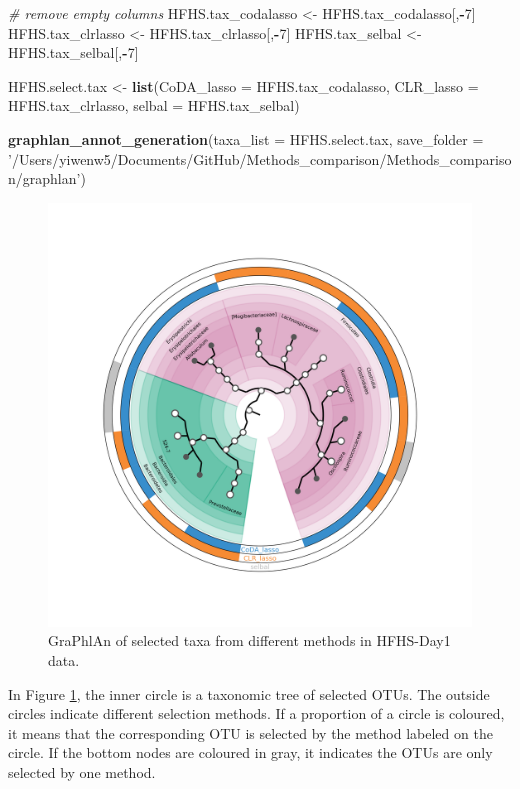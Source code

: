 \documentclass[openany]{book}
\newenvironment{Shaded}{\begin{snugshade}}{\end{snugshade}}
\newcommand{\KeywordTok}[1]{\textcolor[rgb]{0.13,0.29,0.53}{\textbf{#1}}}
\newcommand{\DataTypeTok}[1]{\textcolor[rgb]{0.13,0.29,0.53}{#1}}
\newcommand{\DecValTok}[1]{\textcolor[rgb]{0.00,0.00,0.81}{#1}}
\newcommand{\StringTok}[1]{\textcolor[rgb]{0.31,0.60,0.02}{#1}}
\newcommand{\CommentTok}[1]{\textcolor[rgb]{0.56,0.35,0.01}{\textit{#1}}}
\newcommand{\OperatorTok}[1]{\textcolor[rgb]{0.81,0.36,0.00}{\textbf{#1}}}
\newcommand{\NormalTok}[1]{#1}
\begin{document}
\begin{Shaded}
\begin{Highlighting}[]
\CommentTok{# remove empty columns}
\NormalTok{HFHS.tax_codalasso <-}\StringTok{ }\NormalTok{HFHS.tax_codalasso[,}\OperatorTok{-}\DecValTok{7}\NormalTok{] }
\NormalTok{HFHS.tax_clrlasso <-}\StringTok{ }\NormalTok{HFHS.tax_clrlasso[,}\OperatorTok{-}\DecValTok{7}\NormalTok{]}
\NormalTok{HFHS.tax_selbal <-}\StringTok{ }\NormalTok{HFHS.tax_selbal[,}\OperatorTok{-}\DecValTok{7}\NormalTok{]}

\NormalTok{HFHS.select.tax <-}\StringTok{ }\KeywordTok{list}\NormalTok{(}\DataTypeTok{CoDA_lasso =}\NormalTok{ HFHS.tax_codalasso, }
                        \DataTypeTok{CLR_lasso =}\NormalTok{ HFHS.tax_clrlasso, }
                        \DataTypeTok{selbal =}\NormalTok{ HFHS.tax_selbal)}

\KeywordTok{graphlan_annot_generation}\NormalTok{(}\DataTypeTok{taxa_list =}\NormalTok{ HFHS.select.tax, }
\DataTypeTok{save_folder =} \StringTok{'/Users/yiwenw5/Documents/GitHub/Methods_comparison/Methods_comparison/graphlan'}\NormalTok{)}
\end{Highlighting}
\end{Shaded}

\begin{figure}

{\centering \includegraphics[width=1\linewidth]{./graphlan/taxa} 

}

\caption{GraPhlAn of selected taxa from different methods in HFHS-Day1 data.}\label{fig:graphlanHFHS}
\end{figure}

In Figure \ref{fig:graphlanHFHS}, the inner circle is a taxonomic tree
of selected OTUs. The outside circles indicate different selection
methods. If a proportion of a circle is coloured, it means that the
corresponding OTU is selected by the method labeled on the circle. If
the bottom nodes are coloured in gray, it indicates the OTUs are only
selected by one method.


\end{document}
